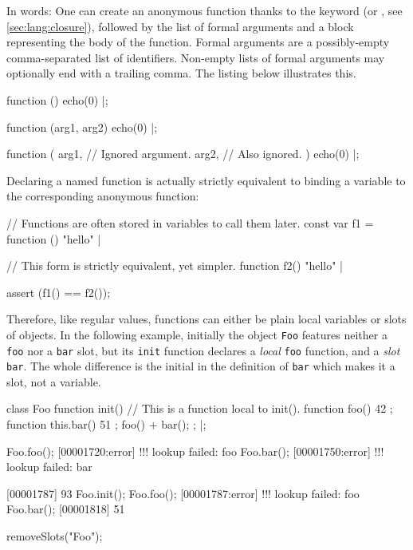 In words: One can create an anonymous function thanks to the
 keyword (or , see
\autoref{sec:lang:closure}), followed by the list of formal arguments and a
block representing the body of the function.  Formal arguments are a
possibly-empty comma-separated list of identifiers.  Non-empty lists of
formal arguments may optionally end with a trailing comma. The listing below
illustrates this.

\begin{urbiscript}
function () { echo(0) }|;

function (arg1, arg2) { echo(0) }|;

function (
           arg1, // Ignored argument.
           arg2, // Also ignored.
          )
{
  echo(0)
}|;
\end{urbiscript}

Declaring a named function is actually strictly equivalent to binding a
variable to the corresponding anonymous function:

\begin{urbiscript}
// Functions are often stored in variables to call them later.
const var f1 = function () { "hello" }|

// This form is strictly equivalent, yet simpler.
function f2() { "hello" }|

assert (f1() == f2());
\end{urbiscript}

Therefore, like regular values, functions can either be plain local
variables or slots of objects.  In the following example, initially the
object \lstinline{Foo} features neither a \lstinline{foo} nor a
\lstinline{bar} slot, but its \lstinline{init} function declares a
\emph{local} \lstinline{foo} function, and a \emph{slot} \lstinline{bar}.
The whole difference is the initial \this in the definition of
\lstinline{bar} which makes it a slot, not a variable.

\begin{urbiscript}
class Foo
{
  function init()
  {
    // This is a function local to init().
    function foo()      { 42 };
    function this.bar() { 51 };
    foo() + bar();
  };
}|;

Foo.foo();
[00001720:error] !!! lookup failed: foo
Foo.bar();
[00001750:error] !!! lookup failed: bar

[00001787] 93
Foo.init();
Foo.foo();
[00001787:error] !!! lookup failed: foo
Foo.bar();
[00001818] 51
\end{urbiscript}
\begin{urbicomment}
removeSlots("Foo");
\end{urbicomment}

